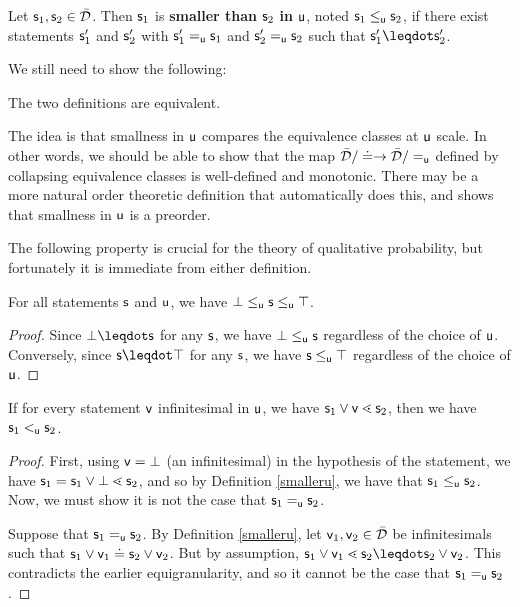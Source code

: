 \documentclass[10pt, onecolumn, longbibliography, nofootinbib]{revtex4-2}
\begin{document}
\begin{defn}\label{smalleru2}
	Let $\stmt_1, \stmt_2 \in \tdomain$. Then $\stmt_1$ is \textbf{smaller than} $\stmt_2$ \textbf{in} $\stmt[u]$, noted $\stmt_1 \lequ \stmt_2$, if there exist statements $\stmt_1'$ and $\stmt_2'$ with $\stmt_1'\equ\stmt_1$ and $\stmt_2'\equ\stmt_2$ such that $\stmt_1'\finer\stmt_2'$.
\end{defn}

We still need to show the following:

\begin{desid}
	The two definitions are equivalent.
\end{desid}

\begin{remark}
	The idea is that smallness in $\stmt[u]$ compares the equivalence classes at $\stmt[u]$ scale. In other words, we should be able to show that the map $\tdomain / \eqgran \to \tdomain / \equ$ defined by collapsing equivalence classes is well-defined and monotonic. There may be a more natural order theoretic definition that automatically does this, and shows that smallness in $\stmt[u]$ is a preorder.
\end{remark}

The following property is crucial for the theory of qualitative probability, but fortunately it is immediate from either definition. 

\begin{prop}
For all statements $\stmt$ and $\stmt[u]$, we have $\impossibility\lequ\stmt\lequ\certainty$.
\end{prop}
\begin{proof}
	Since $\impossibility \finer \stmt$ for any $\stmt$, we have $\impossibility\lequ\stmt$ regardless of the choice of $\stmt[u]$. Conversely, since $\stmt \finer \certainty$ for any $\stmt$, we have $\stmt\lequ\certainty$ regardless of the choice of $\stmt[u]$.
\end{proof}

\begin{prop}
	If for every statement $\stmt[v]$ infinitesimal in $\stmt[u]$, we have $\stmt_1\OR\stmt[v] \sfiner \stmt_2$, then we have $\stmt_1 \ltu \stmt_2$. 
\end{prop}
\begin{proof}
	First, using $\stmt[v] = \impossibility$ (an infinitesimal) in the hypothesis of the statement, we have $\stmt_1 = \stmt_1\OR\impossibility \sfiner \stmt_2$, and so by Definition \ref{smalleru}, we have that $\stmt_1\lequ\stmt_2$. Now, we must show it is not the case that $\stmt_1\equ \stmt_2$. 
	
	Suppose that $\stmt_1 \equ \stmt_2$. By Definition \ref{smalleru}, let $\stmt[v]_1,\stmt[v]_2\in\tdomain$ be infinitesimals such that $\stmt_1 \OR \stmt[v]_1 \eqgran \stmt_2 \OR \stmt[v]_2$. But by assumption, $\stmt_1\OR\stmt[v]_1 \sfiner \stmt_2 \finer\stmt_2\OR\stmt[v]_2$. This contradicts the earlier equigranularity, and so it cannot be the case that $\stmt_1\equ\stmt_2$. 
\end{proof}
\end{document}
